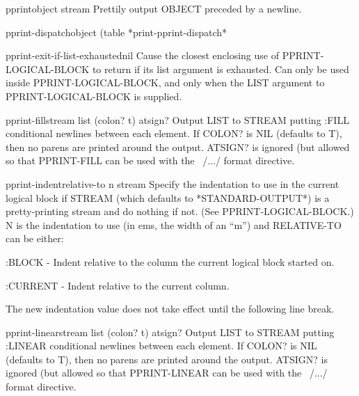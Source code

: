 \begin{function}{pprint}{object \op stream}{}
  Prettily output OBJECT preceded by a newline.
\end{function}

\begin{function}{pprint-dispatch}{object \op (table *print-pprint-dispatch*}{}
  
\end{function}

\begin{local-macro}{pprint-exit-if-list-exhausted}{nil}{}
  Cause the closest enclosing use of PPRINT-LOGICAL-BLOCK to return
   if its list argument is exhausted. Can only be used inside
   PPRINT-LOGICAL-BLOCK, and only when the LIST argument to
   PPRINT-LOGICAL-BLOCK is supplied.
\end{local-macro}

\begin{function}{pprint-fill}{stream list \op (colon? t) atsign?}{}
  Output LIST to STREAM putting :FILL conditional newlines between each
   element. If COLON? is NIL (defaults to T), then no parens are printed
   around the output. ATSIGN? is ignored (but allowed so that PPRINT-FILL
   can be used with the ~/.../ format directive.
\end{function}

\begin{function}{pprint-indent}{relative-to n \op stream}{}
  Specify the indentation to use in the current logical block if
STREAM (which defaults to *STANDARD-OUTPUT*) is a pretty-printing
stream and do nothing if not. (See PPRINT-LOGICAL-BLOCK.) N is the
indentation to use (in ems, the width of an ``m'') and RELATIVE-TO can
be either:

     :BLOCK - Indent relative to the column the current logical block
        started on.

     :CURRENT - Indent relative to the current column.

The new indentation value does not take effect until the following
line break.
\end{function}

\begin{function}{pprint-linear}{stream list \op (colon? t) atsign?}{}
  Output LIST to STREAM putting :LINEAR conditional newlines between each
   element. If COLON? is NIL (defaults to T), then no parens are printed
   around the output. ATSIGN? is ignored (but allowed so that PPRINT-LINEAR
   can be used with the ~/.../ format directive.
\end{function}

